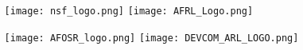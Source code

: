 \begin{frame}[plain]
  \vspace{0.4in}
  \begin{center}
    \vfill
      {\Huge{}}
    \vfill
  \end{center}

  

  \begin{columns}
    \hfill
    \begin{column}[T]{0.48\textwidth}
      \centering
        \begin{center}
        \end{center}
    \end{column}
    \hfill
    \begin{column}[T]{0.48\textwidth}
      \centering
      \medskip

      \begin{minipage}{\linewidth}%
        \centering
        \hfill
        \texttt{[image: nsf\_logo.png]}%
        \hfill
        \texttt{[image: AFRL\_Logo.png]} 
        \hfill
      \end{minipage}%

      \begin{minipage}{\linewidth}%
        \centering
        \hfill
        \texttt{[image: AFOSR\_logo.png]} 
        \hfill
        \texttt{[image: DEVCOM\_ARL\_LOGO.png]} %
        \hfill
      \end{minipage}%
    \end{column}
    \hfill
  \end{columns}
  
\end{frame}